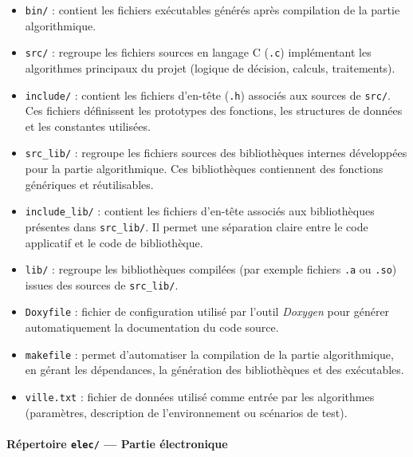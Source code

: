 \begin{itemize}
    \item \texttt{bin/} : contient les fichiers exécutables générés après compilation de la partie algorithmique.
    
    \item \texttt{src/} : regroupe les fichiers sources en langage C (\texttt{.c}) implémentant les algorithmes principaux
    du projet (logique de décision, calculs, traitements).
    
    \item \texttt{include/} : contient les fichiers d’en-tête (\texttt{.h}) associés aux sources de \texttt{src/}.
    Ces fichiers définissent les prototypes des fonctions, les structures de données et les constantes utilisées.
    
    \item \texttt{src\_lib/} : regroupe les fichiers sources des bibliothèques internes développées pour la partie algorithmique.
    Ces bibliothèques contiennent des fonctions génériques et réutilisables.
    
    \item \texttt{include\_lib/} : contient les fichiers d’en-tête associés aux bibliothèques présentes dans \texttt{src\_lib/}.
    Il permet une séparation claire entre le code applicatif et le code de bibliothèque.
    
    \item \texttt{lib/} : regroupe les bibliothèques compilées (par exemple fichiers \texttt{.a} ou \texttt{.so})
    issues des sources de \texttt{src\_lib/}.
    
    \item \texttt{Doxyfile} : fichier de configuration utilisé par l’outil \textit{Doxygen} pour générer automatiquement
    la documentation du code source.
    
    \item \texttt{makefile} : permet d’automatiser la compilation de la partie algorithmique,
    en gérant les dépendances, la génération des bibliothèques et des exécutables.
    
    \item \texttt{ville.txt} : fichier de données utilisé comme entrée par les algorithmes
    (paramètres, description de l’environnement ou scénarios de test).
\end{itemize}

\paragraph{Répertoire \texttt{elec/} — Partie électronique}

